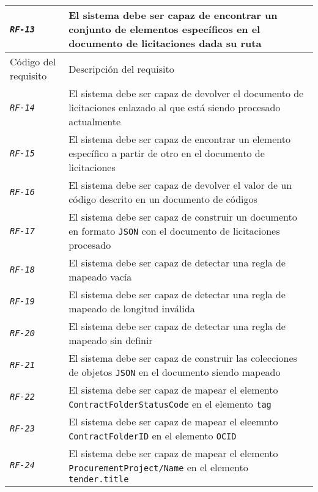 \begin{longtable}{|| M{3cm} | M{12cm} ||}
                \hline
                    \texttt{\textit{RF-13}} & El sistema debe ser capaz de encontrar un conjunto de elementos específicos en el documento de licitaciones dada su ruta \\
                \hline
                    Código del requisito & Descripción del requisito \\
                \hline
                \hline
                    \texttt{\textit{RF-14}} & El sistema debe ser capaz de devolver el documento de licitaciones enlazado al que está siendo procesado actualmente \\
                \hline
                    \texttt{\textit{RF-15}} & El sistema debe ser capaz de encontrar un elemento específico a partir de otro en el documento de licitaciones \\
                \hline
                    \texttt{\textit{RF-16}} & El sistema debe ser capaz de devolver el valor de un código descrito en un documento de códigos \\
                \hline
                    \texttt{\textit{RF-17}} & El sistema debe ser capaz de construir un documento en formato \texttt{JSON} con el documento de licitaciones procesado \\
                \hline
                    \texttt{\textit{RF-18}} & El sistema debe ser capaz de detectar una regla de mapeado vacía \\
                \hline
                    \texttt{\textit{RF-19}} & El sistema debe ser capaz de detectar una regla de mapeado de longitud inválida \\
                \hline
                    \texttt{\textit{RF-20}} & El sistema debe ser capaz de detectar una regla de mapeado sin definir \\
                \hline
                    \texttt{\textit{RF-21}} & El sistema debe ser capaz de construir las colecciones de objetos \texttt{JSON} en el documento siendo mapeado \\
                \hline
                    \texttt{\textit{RF-22}} & El sistema debe ser capaz de mapear el elemento \texttt{ContractFolderStatusCode} en el elemento \texttt{tag} \\
                \hline
                    \texttt{\textit{RF-23}} & El sistema debe ser capaz de mapear el eleemnto \texttt{ContractFolderID} en el elemento \texttt{OCID} \\
                \hline
                    \texttt{\textit{RF-24}} & El sistema debe ser capaz de mapear el elemento \texttt{ProcurementProject/Name} en el elemento \texttt{tender.title} \\

\end{longtable}
